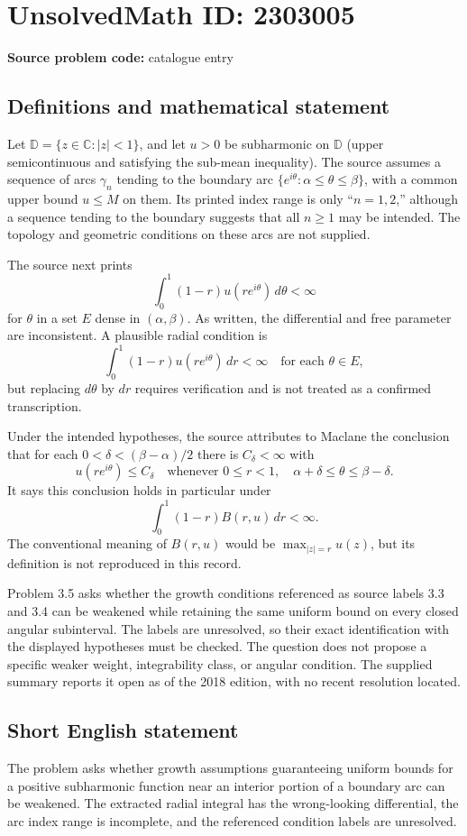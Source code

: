 \documentclass[11pt]{article}
\newcommand{\C}{\mathbb{C}}
\begin{document}
\section*{UnsolvedMath ID: 2303005}
\textbf{Source problem code:} catalogue entry
\subsection{Definitions and mathematical statement}
Let $\mathbb D=\{z\in\C:|z|<1\}$, and let $u>0$ be subharmonic on $\mathbb D$ (upper semicontinuous and satisfying the sub-mean inequality). The source assumes a sequence of arcs $\gamma_n$ tending to the boundary arc $\{e^{i\theta}:\alpha\leq\theta\leq\beta\}$, with a common upper bound $u\leq M$ on them. Its printed index range is only ``$n=1,2$,'' although a sequence tending to the boundary suggests that all $n\geq1$ may be intended. The topology and geometric conditions on these arcs are not supplied.

The source next prints
\[
\int_0^1(1-r)u(re^{i\theta})\,d\theta<\infty
\]
for $\theta$ in a set $E$ dense in $(\alpha,\beta)$. As written, the differential and free parameter are inconsistent. A plausible radial condition is
\[
\int_0^1(1-r)u(re^{i\theta})\,dr<\infty
\quad\text{for each }\theta\in E,
\]
but replacing $d\theta$ by $dr$ requires verification and is not treated as a confirmed transcription.

Under the intended hypotheses, the source attributes to Maclane the conclusion that for each $0<\delta<(\beta-\alpha)/2$ there is $C_\delta<\infty$ with
\[
u(re^{i\theta})\leq C_\delta
\quad\text{whenever }0\leq r<1,\quad
\alpha+\delta\leq\theta\leq\beta-\delta.
\]
It says this conclusion holds in particular under
\[
\int_0^1(1-r)B(r,u)\,dr<\infty.
\]
The conventional meaning of $B(r,u)$ would be $\max_{|z|=r}u(z)$, but its definition is not reproduced in this record.

Problem 3.5 asks whether the growth conditions referenced as source labels 3.3 and 3.4 can be weakened while retaining the same uniform bound on every closed angular subinterval. The labels are unresolved, so their exact identification with the displayed hypotheses must be checked. The question does not propose a specific weaker weight, integrability class, or angular condition. The supplied summary reports it open as of the 2018 edition, with no recent resolution located.
\subsection{Short English statement}
The problem asks whether growth assumptions guaranteeing uniform bounds for a positive subharmonic function near an interior portion of a boundary arc can be weakened. The extracted radial integral has the wrong-looking differential, the arc index range is incomplete, and the referenced condition labels are unresolved.
\end{document}
